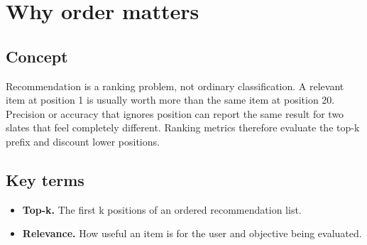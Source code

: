 \section{Why order matters}

\begin{abstract}
Users scan from the top and often stop early, so position changes value.
\end{abstract}

\subsection{Concept}
Recommendation is a ranking problem, not ordinary classification. A relevant item at position 1 is usually worth more than the same item at position 20. Precision or accuracy that ignores position can report the same result for two slates that feel completely different. Ranking metrics therefore evaluate the top-k prefix and discount lower positions.

\subsection{Key terms}
\begin{itemize}
\item \textbf{Top-k.} The first k positions of an ordered recommendation list.
\item \textbf{Relevance.} How useful an item is for the user and objective being evaluated.
\end{itemize}
